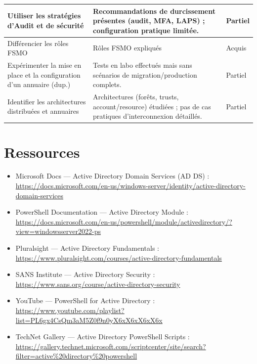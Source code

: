 \begin{center}
\begin{tabular}{|p{}|p{}|m{}|}
Utiliser les stratégies d'Audit et de sécurité &
Recommandations de durcissement présentes (audit, MFA, LAPS) ; configuration pratique limitée. &
{\color{orange}Partiel} \\ \hline
Différencier les rôles FSMO &
Rôles FSMO expliqués  &
{\color{green!60!black}Acquis} \\ \hline

Expérimenter la mise en place et la configuration d'un annuaire (dup.) &
Tests en labo effectués mais sans scénarios de migration/production complets. &
{\color{orange}Partiel} \\ \hline

Identifier les architectures distribuées et annuaires &
Architectures (forêts, trusts, account/resource) étudiées ; pas de cas pratiques d'interconnexion détaillés. &
{\color{orange}Partiel} \\ \hline

\end{tabular}
\end{center}

\section*{Ressources}

\begin{itemize}
	\item Microsoft Docs — Active Directory Domain Services (AD DS) : \\
	\url{https://docs.microsoft.com/en-us/windows-server/identity/active-directory-domain-services}
	\item PowerShell Documentation — Active Directory Module : \\
	\url{https://docs.microsoft.com/en-us/powershell/module/activedirectory/?view=windowsserver2022-ps}
	\item Pluralsight — Active Directory Fundamentals : \\
	\url{https://www.pluralsight.com/courses/active-directory-fundamentals}
	\item SANS Institute — Active Directory Security : \\
	\url{https://www.sans.org/course/active-directory-security}
	\item YouTube — PowerShell for Active Directory : \\
	\url{https://www.youtube.com/playlist?list=PL6gx4CsQm3aM5Z0f9n0yX6xX6xX6xX6x}
	\item TechNet Gallery — Active Directory PowerShell Scripts : \\
	\url{https://gallery.technet.microsoft.com/scriptcenter/site/search?filter=active%20directory%20powershell}
\end{itemize}
